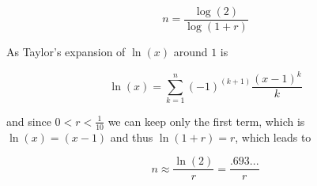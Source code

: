 \documentclass[a4paper] {scrartcl}
\begin{document}
\begin{equation}
	n = \frac{\log{(2)}}{\log{(1+r)}}
\end{equation}

As Taylor's expansion of $\ln{(x)}$ around $1$ is

\begin{equation}
	\ln{(x)} = \sum_{k=1}^n (-1)^{(k+1)}\frac{(x-1)^k}{k}
\end{equation}

and since $0<r<\frac{1}{10}$ we can keep only the first term, which is $\ln{(x)} =  (x-1)$  and thus $\ln{(1+r)} = r$, which leads to

\begin{equation}
	n \approx \frac{\ln{(2)}}{r} = \frac{.693...}{r}
\end{equation}  
\end{document}
